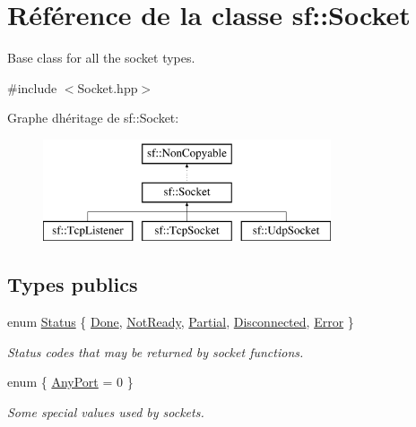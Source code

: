 \hypertarget{classsf_1_1Socket}{}\section{Référence de la classe sf\+:\+:Socket}
\label{classsf_1_1Socket}


Base class for all the socket types.  




{\ttfamily \#include $<$Socket.\+hpp$>$}

Graphe d\textquotesingle{}héritage de sf\+:\+:Socket\+:\begin{figure}[H]
\begin{center}
\leavevmode
\includegraphics[height=3.000000cm]{classsf_1_1Socket}
\end{center}
\end{figure}
\subsection*{Types publics}
\begin{DoxyCompactItemize}
\item 
enum \hyperlink{classsf_1_1Socket_a51bf0fd51057b98a10fbb866246176dc}{Status} \{ \newline
\hyperlink{classsf_1_1Socket_a51bf0fd51057b98a10fbb866246176dca1de3a85bc56d3ae85b3d0f3cfd04ae90}{Done}, 
\hyperlink{classsf_1_1Socket_a51bf0fd51057b98a10fbb866246176dca8554848daae98f996e131bdeed076c09}{Not\+Ready}, 
\hyperlink{classsf_1_1Socket_a51bf0fd51057b98a10fbb866246176dca181c163fad2eaea927185d127c392706}{Partial}, 
\hyperlink{classsf_1_1Socket_a51bf0fd51057b98a10fbb866246176dcab215141f756acdc23c67fad149710eb1}{Disconnected}, 
\newline
\hyperlink{classsf_1_1Socket_a51bf0fd51057b98a10fbb866246176dca1dc9854433a28c22e192721179a2df5d}{Error}
 \}\begin{DoxyCompactList}\small\item\em Status codes that may be returned by socket functions. \end{DoxyCompactList}
\item 
enum \{ \hyperlink{classsf_1_1Socket_a5deb2c955fd347259c3a20d27b2481aaa5a3c30fd128895403afc11076f461b19}{Any\+Port} = 0
 \}\begin{DoxyCompactList}\small\item\em Some special values used by sockets. \end{DoxyCompactList}
\end{DoxyCompactItemize}
